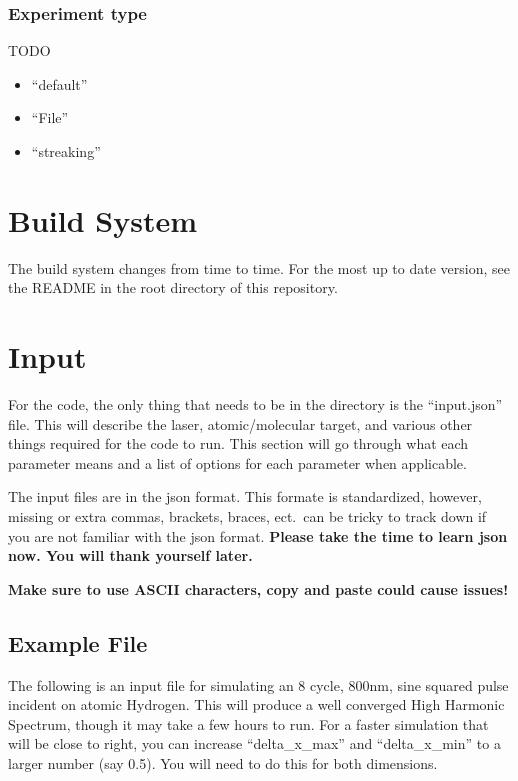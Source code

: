 \documentclass{article}
\begin{document}
\subsubsection{Experiment type} %
\label{ssub:experiment_type}
TODO
\begin{itemize}
  \item ``default''
  \item ``File''
  \item ``streaking''
\end{itemize}



\section{Build System} %
\label{sec:build_system}
The build system changes from time to time. For the most up to date version, see the README in the root directory of this repository.

\section{Input} %
\label{sec:input}

For the code, the only thing that needs to be in the directory is the ``input.json'' file. This will describe the laser, atomic/molecular target, and various other things required for the code to run. This section will go through what each parameter means and a list of options for each parameter when applicable.

The input files are in the json format. This formate is standardized, however, missing or extra commas, brackets, braces, ect.\ can be tricky to track down if you are not familiar with the json format. \textbf{Please take the time to learn json now. You will thank yourself later.}

\textbf{Make sure to use ASCII characters, copy and paste could cause issues!}

\subsection{Example File} %
\label{sub:example_file}
The following is an input file for simulating an 8 cycle, 800nm, sine squared pulse incident on atomic Hydrogen. This will produce a well converged High Harmonic Spectrum, though it may take a few hours to run. For a faster simulation that will be close to right, you can increase ``delta\_x\_max'' and ``delta\_x\_min'' to a larger number (say 0.5). You will need to do this for both dimensions.
\end{document}
